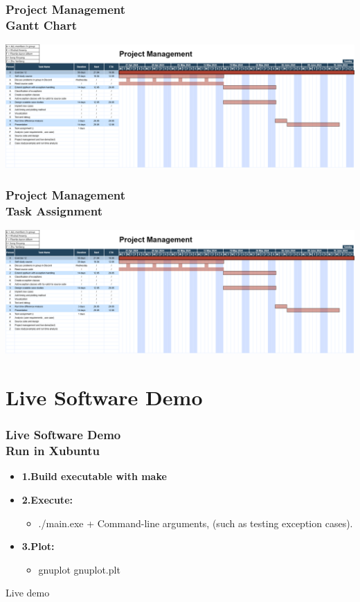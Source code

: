 \documentclass[ucs,10pt]{beamer}
\begin{document}
\begin{frame}
\frametitle{Project Management \\
	\small \color{rwth-blue} Gantt Chart}
	
	\begin{center}
		\includegraphics[width=\textwidth]{figures/project management.png}
	\end{center}
\end{frame}

\begin{frame}
\frametitle{Project Management \\
	\small \color{rwth-blue} Task Assignment}
	
	\begin{flushleft}
		\includegraphics[height=\textheight,keepaspectratio]{figures/project management.png}
	\end{flushleft}
\end{frame}
	
\section{Live Software Demo}

\begin{frame}
\frametitle{Live Software Demo \\
	\small \color{rwth-blue} Run in Xubuntu}
	\begin{itemize}	
			\item \textbf{1.Build executable with make}
			\item \textbf{2.Execute:}
				\begin{itemize}
				\item ./main.exe + Command-line arguments, (such as testing exception cases).
				\end{itemize}
			\item \textbf{3.Plot:}
				\begin{itemize}
				\item gnuplot gnuplot.plt
				\end{itemize}
	\end{itemize}
	\begin{center}
		\large Live demo
	\end{center}
\end{frame}
\end{document}
